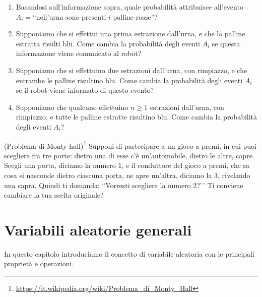 \documentclass[
  italian,
  letterpaper,
]{book}
\providecommand{\tightlist}{%
  \setlength{\itemsep}{0pt}\setlength{\parskip}{0pt}}
\theoremstyle{definition}
\theoremstyle{remark}
\begin{document}
\begin{enumerate}
\def\labelenumi{\arabic{enumi}.}
\tightlist
\item
  Basandosi sull'informazione sopra, quale probabilità attribuisce
  all'evento
  \(A_i = \text{``nell'urna sono  presenti $i$ palline rosse''}\)?
\item
  Supponiamo che si effettui una prima estrazione dall'urna, e che la
  palline estratta risulti blu. Come cambia la probabilità degli eventi
  \(A_i\) se questa informazione viene comunicato al robot?
\item
  Supponiamo che si effettuino due estrazioni dall'urna, con rimpiazzo,
  e che entrambe le palline risultino blu. Come cambia la probabilità
  degli eventi \(A_i\) se il robot viene informato di questo evento?
\item
  Supponiamo che qualcuno effettuino \(n\ge1\) estrazioni dall'urna, con
  rimpiazzo, e tutte le palline estratte risultino blu. Come cambia la
  probabilità degli eventi \(A_i\)?
\end{enumerate}

(Problema di Monty hall)\footnote{\url{https://it.wikipedia.org/wiki/Problema_di_Monty_Hall}}
Supponi di partecipare a un gioco a premi, in cui puoi scegliere fra tre
porte: dietro una di esse c'è un'automobile, dietro le altre, capre.
Scegli una porta, diciamo la numero \(1\), e il conduttore del gioco a
premi, che sa cosa si nasconde dietro ciascuna porta, ne apre un'altra,
diciamo la \(3\), rivelando una capra. Quindi ti domanda: ``Vorresti
scegliere la numero \(2\)?'\,' Ti conviene cambiare la tua scelta
originale?


\chapter{Variabili aleatorie generali}\label{sec-va-generali}

In questo capitolo introduciamo il concetto di variabile aleatoria con
le principali proprietà e operazioni.
\end{document}
